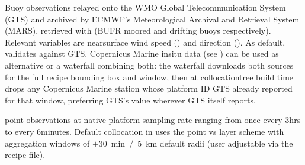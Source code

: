 \documentclass[a4paper,10pt,english]{sphinxmanual}
\begin{document}
\sphinxAtStartPar
Buoy observations relayed onto the WMO Global Telecommunication System (GTS) and archived by ECMWF’s Meteorological Archival and Retrieval System (MARS), retrieved with  (BUFR moored and drifting buoys respectively). Relevant variables are near\sphinxhyphen{}surface wind speed () and direction (). As default,  validates against GTS. Copernicus Marine in\sphinxhyphen{}situ data (see {\hyperref[\detokenize{05_reference_datasets:subpar-cmems-insitu}]{}}) can be used as alternative or a waterfall combining both: the waterfall downloads both sources for the full recipe bounding box and window, then at collocation\sphinxhyphen{}tree build time drops any Copernicus Marine station whose platform ID GTS already reported for that window, preferring GTS’s value wherever GTS itself reports.

\sphinxAtStartPar
{}

\sphinxAtStartPar
point observations at native platform sampling rate ranging from once every 3\sphinxhyphen{}hrs to every 6\sphinxhyphen{}minutes. Default collocation in  uses the point vs layer scheme with aggregation windows of \(\pm\)30 min / 5 km default radii (user adjustable via the  recipe file).

\sphinxAtStartPar
{}
\end{document}
